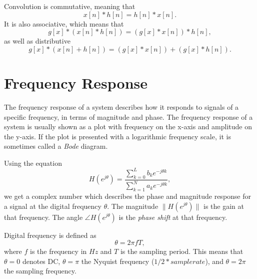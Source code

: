 \documentclass[openany]{book}
\def\lsqb{\left[}
\def\rsqb{\right]}
\def\sqb#1{\lsqb #1 \rsqb}
\def\xsig{x\sqb{n}}
\begin{document}
Convolution is commutative, meaning that
\begin{equation}
    \xsig * h\sqb{n} = h\sqb{n} * \xsig.
\end{equation}
It is also associative, which means that
\begin{equation}
    g\sqb{x} * (\xsig * h\sqb{n}) = (g\sqb{x} * \xsig) * h\sqb{n},
\end{equation}
as well as distributive
\begin{equation}
    g\sqb{x} * (\xsig + h\sqb{n}) = (g\sqb{x} * \xsig) + (g\sqb{x} *  h\sqb{n}).
\end{equation}

\section{Frequency Response}
The frequency response of a system describes how it responds to signals of a specific frequency, in terms of magnitude and phase. The frequency response of a system is usually shown as a plot with frequency on the x-axis and amplitude on the y-axis. If the plot is presented with a logarithmic frequency scale, it is sometimes called a \textit{Bode} diagram.

Using the equation
\begin{equation}
    H(e^{j\theta}) = \frac{\sum_{k=0}^{L} b_k e^{-j\theta k}}{\sum_{k=1}^{N} a_k e^{-j\theta k}},
\end{equation}
we get a complex number which describes the phase and magnitude response for a signal at the digital frequency $\theta$. The magnitude $\|H(e^{j\theta})\|$ is the gain at that frequency. The angle $\angle H(e^{j\theta})$ is the \textit{phase shift} at that frequency.

Digital frequency is defined as
\begin{equation}
    \theta = 2\pi f T,
\end{equation}
where $f$ is the frequency in $Hz$ and $T$ is the sampling period. This means that $\theta=0$ denotes DC, $\theta=\pi$ the Nyquist frequency ($1/2 * samplerate$), and $\theta=2\pi$ the sampling frequency.





\printindex
\end{document}
